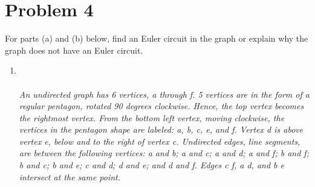 \documentclass{amsart}
\theoremstyle{definition}
\theoremstyle{Exercise}
\theoremstyle{remark}
\theoremstyle{rule}
\numberwithin{equation}{section}
\begin{document}
\section*{Problem 4}
For parts (a) and (b) below, find an Euler circuit in the graph or explain why the graph does not have an Euler circuit.\\
\begin{enumerate}[label=(\alph*)]
\item
{}\\\\
{\color{blue}{\bf Figure 9:} \emph{An undirected graph has 6 vertices, a through f. 5 vertices are in the form of a regular pentagon, rotated 90 degrees clockwise. Hence, the top vertex becomes the rightmost vertex. From the bottom left vertex, moving clockwise, the vertices in the pentagon shape are labeled: a, b, c, e, and f. Vertex d is above vertex e, below and to the right of vertex c. Undirected edges, line segments, are between the following vertices: a and b; a and c; a and d; a and f; b and f; b and c; b and e; c and d; d and e; and d and f. Edges c f, a d, and b e intersect at the same point.
\\
}
}
\\
\\
\\\\


\end{enumerate}
\end{document}
